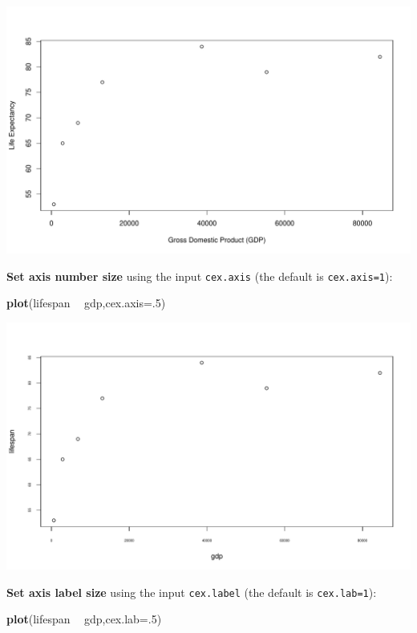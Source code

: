 \documentclass[
]{book}
\newenvironment{Shaded}{\begin{snugshade}}{\end{snugshade}}
\newcommand{\DataTypeTok}[1]{\textcolor[rgb]{0.13,0.29,0.53}{#1}}
\newcommand{\DecValTok}[1]{\textcolor[rgb]{0.00,0.00,0.81}{#1}}
\newcommand{\KeywordTok}[1]{\textcolor[rgb]{0.13,0.29,0.53}{\textbf{#1}}}
\newcommand{\NormalTok}[1]{#1}
\newcommand{\OperatorTok}[1]{\textcolor[rgb]{0.81,0.36,0.00}{\textbf{#1}}}
\newcommand{\StringTok}[1]{\textcolor[rgb]{0.31,0.60,0.02}{#1}}
\begin{document}
\includegraphics{figures/unnamed-chunk-109-1.pdf}

\textbf{Set axis number size} using the input \texttt{cex.axis} (the default is \texttt{cex.axis=1}):

\begin{Shaded}
\begin{Highlighting}[]
\KeywordTok{plot}\NormalTok{(lifespan }\OperatorTok{~}\StringTok{ }\NormalTok{gdp,}\DataTypeTok{cex.axis=}\NormalTok{.}\DecValTok{5}\NormalTok{)}
\end{Highlighting}
\end{Shaded}

\includegraphics{figures/unnamed-chunk-110-1.pdf}

\textbf{Set axis label size} using the input \texttt{cex.label} (the default is \texttt{cex.lab=1}):

\begin{Shaded}
\begin{Highlighting}[]
\KeywordTok{plot}\NormalTok{(lifespan }\OperatorTok{~}\StringTok{ }\NormalTok{gdp,}\DataTypeTok{cex.lab=}\NormalTok{.}\DecValTok{5}\NormalTok{)}
\end{Highlighting}
\end{Shaded}
\end{document}
